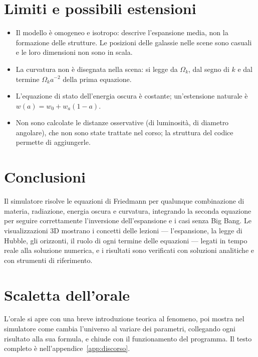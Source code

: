 \documentclass[11pt,a4paper]{article}
\newcommand{\Ok}{\Omega_k}
\begin{document}
\section{Limiti e possibili estensioni}
\begin{itemize}
  \item Il modello è omogeneo e isotropo: descrive l'espansione media, non la formazione delle strutture. Le posizioni delle galassie nelle scene sono casuali e le loro dimensioni non sono in scala.
  \item La curvatura non è disegnata nella scena: si legge da $\Ok$, dal segno di $k$ e dal termine $\Ok a^{-2}$ della prima equazione.
  \item L'equazione di stato dell'energia oscura è costante; un'estensione naturale è $w(a)=w_0+w_a(1-a)$.
  \item Non sono calcolate le distanze osservative (di luminosità, di diametro angolare), che non sono state trattate nel corso; la struttura del codice permette di aggiungerle.
\end{itemize}

\section{Conclusioni}
Il simulatore risolve le equazioni di Friedmann per qualunque combinazione di materia, radiazione, energia oscura e curvatura, integrando la seconda equazione per seguire correttamente l'inversione dell'espansione e i casi senza Big Bang. Le visualizzazioni 3D mostrano i concetti delle lezioni --- l'espansione, la legge di Hubble, gli orizzonti, il ruolo di ogni termine delle equazioni --- legati in tempo reale alla soluzione numerica, e i risultati sono verificati con soluzioni analitiche e con strumenti di riferimento.

\appendix

\section{Scaletta dell'orale}
L'orale si apre con una breve introduzione teorica al fenomeno, poi mostra nel simulatore come cambia l'universo al variare dei parametri, collegando ogni risultato alla sua formula, e chiude con il funzionamento del programma. Il testo completo è nell'appendice~\ref{app:discorso}.
\end{document}
